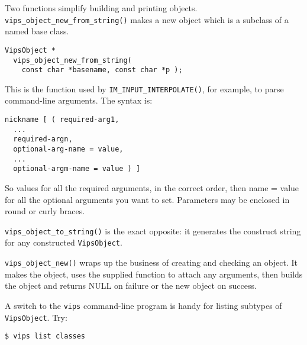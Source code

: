 Two functions simplify building and printing objects.
\verb+vips_object_new_from_string()+ makes a new object which is a subclass of
a named base class.

\begin{verbatim}
VipsObject *
  vips_object_new_from_string( 
    const char *basename, const char *p );
\end{verbatim}

This is the function used by \verb+IM_INPUT_INTERPOLATE()+, for example, to
parse command-line arguments. The syntax is:

\begin{verbatim}
nickname [ ( required-arg1, 
  ...
  required-argn,
  optional-arg-name = value,
  ...
  optional-argm-name = value ) ]
\end{verbatim}

So values for all the required arguments, in the correct order, then name =
value for all the optional arguments you want to set. Parameters may be
enclosed in round or curly braces.

\verb+vips_object_to_string()+ is the exact opposite: it generates the 
construct string for any constructed
\verb+VipsObject+.

\verb+vips_object_new()+ wraps up the business of creating and checking an
object. It makes the object, uses the supplied function to attach any
arguments, then builds the object and returns NULL on failure or the new
object on success.

A switch to the \verb+vips+ command-line program is handy for listing subtypes
of \verb+VipsObject+. Try:

\begin{verbatim}
$ vips list classes
\end{verbatim}

